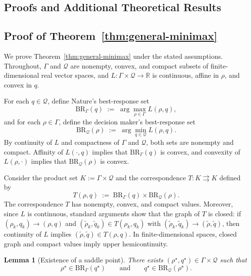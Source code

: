 \documentclass{article}
\newtheorem{lemma}{Lemma}
\theoremstyle{plain}
\theoremstyle{definition}
\begin{document}
\clearpage
\newpage
\onecolumn
\begin{appendices}
\section{Proofs and Additional Theoretical Results}

\subsection{Proof of Theorem~\ref{thm:general-minimax}}
\label{app:general-minimax}

We prove Theorem~\ref{thm:general-minimax} under the stated assumptions. Throughout, $\Gamma$ and $\mathcal{Q}$ are nonempty, convex, and compact subsets
of finite-dimensional real vector spaces, and
$L:\Gamma\times\mathcal{Q}\to\mathbb{R}$ is continuous, affine in $\rho$, and
convex in $q$.

For each $q\in\mathcal{Q}$, define Nature’s best-response set
\[
\mathrm{BR}_{\Gamma}(q)
\;:=\;
\arg\max_{\rho\in\Gamma} L(\rho,q),
\]
and for each $\rho\in\Gamma$, define the decision maker’s best-response set
\[
\mathrm{BR}_{\mathcal{Q}}(\rho)
\;:=\;
\arg\min_{q\in\mathcal{Q}} L(\rho,q).
\]
By continuity of $L$ and compactness of $\Gamma$ and $\mathcal{Q}$, both sets are
nonempty and compact. Affinity of $L(\cdot,q)$ implies that
$\mathrm{BR}_{\Gamma}(q)$ is convex, and convexity of $L(\rho,\cdot)$ implies that
$\mathrm{BR}_{\mathcal{Q}}(\rho)$ is convex.

Consider the product set $K:=\Gamma\times\mathcal{Q}$ and the correspondence
$T:K\rightrightarrows K$ defined by
\[
T(\rho,q)
\;:=\;
\mathrm{BR}_{\Gamma}(q)\times \mathrm{BR}_{\mathcal{Q}}(\rho).
\]
The correspondence $T$ has nonempty, convex, and compact values.
Moreover, since $L$ is continuous, standard arguments show that the graph of $T$
is closed: if $(\rho_k,q_k)\to(\rho,q)$ and
$(\tilde\rho_k,\tilde q_k)\in T(\rho_k,q_k)$ with
$(\tilde\rho_k,\tilde q_k)\to(\tilde\rho,\tilde q)$, then continuity of $L$
implies $(\tilde\rho,\tilde q)\in T(\rho,q)$.
In finite-dimensional spaces, closed graph and compact values imply upper
hemicontinuity.

\begin{lemma}[Existence of a saddle point]
There exists $(\rho^\star,q^\star)\in\Gamma\times\mathcal{Q}$ such that
\[
\rho^\star\in \mathrm{BR}_{\Gamma}(q^\star)
\qquad\text{and}\qquad
q^\star\in \mathrm{BR}_{\mathcal{Q}}(\rho^\star).
\]
\end{lemma}


\end{appendices}
\end{document}
